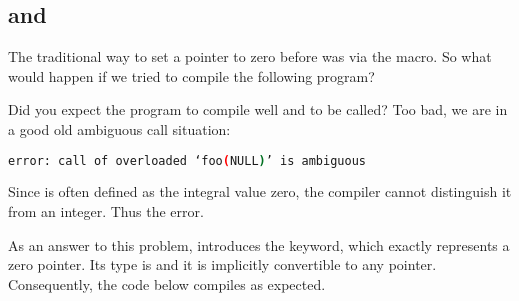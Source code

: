 \subsection{ and }

The traditional way to set a pointer to zero before  was via the
 macro. So what would happen if we tried to compile the
following program?



Did you expect the program to compile well and  to be
called? Too bad, we are in a good old ambiguous call situation:

\begin{lstlisting}[language=bash]
error: call of overloaded ‘foo(NULL)’ is ambiguous
\end{lstlisting}

Since  is often defined as the integral value zero, the
compiler cannot distinguish it from an integer. Thus the error.

\bigskip

%
%
As an answer to this problem,  introduces the 
keyword, which exactly represents a zero pointer. Its type is
 and it is implicitly convertible to any
pointer. Consequently, the code below compiles as expected.


